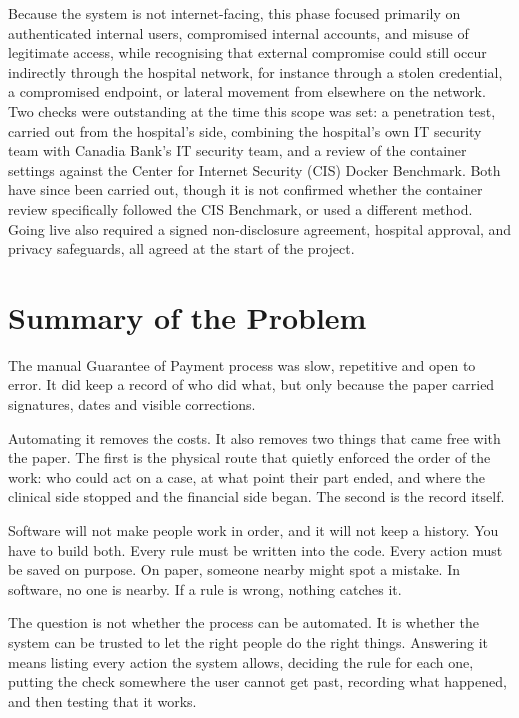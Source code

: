 Because the system is not internet-facing, this phase focused primarily on authenticated internal users, compromised internal accounts, and misuse of legitimate access, while recognising that external compromise could still occur indirectly through the hospital network, for instance through a stolen credential, a compromised endpoint, or lateral movement from elsewhere on the network. Two checks were outstanding at the time this scope was set: a penetration test, carried out from the hospital's side, combining the hospital's own IT security team with Canadia Bank's IT security team, and a review of the container settings against the Center for Internet Security (CIS) Docker Benchmark. Both have since been carried out, though it is not confirmed whether the container review specifically followed the CIS Benchmark, or used a different method. Going live also required a signed non-disclosure agreement, hospital approval, and privacy safeguards, all agreed at the start of the project.

\section{Summary of the Problem}
\label{sec:ps-summary}

The manual Guarantee of Payment process was slow, repetitive and open to error. It did keep a record of who did what, but only because the paper carried signatures, dates and visible corrections.

Automating it removes the costs. It also removes two things that came free with the paper. The first is the physical route that quietly enforced the order of the work: who could act on a case, at what point their part ended, and where the clinical side stopped and the financial side began. The second is the record itself.

Software will not make people work in order, and it will not keep a history. You have to build both. Every rule must be written into the code. Every action must be saved on purpose. On paper, someone nearby might spot a mistake. In software, no one is nearby. If a rule is wrong, nothing catches it.

The question is not whether the process can be automated. It is whether the system can be trusted to let the right people do the right things. Answering it means listing every action the system allows, deciding the rule for each one, putting the check somewhere the user cannot get past, recording what happened, and then testing that it works.
